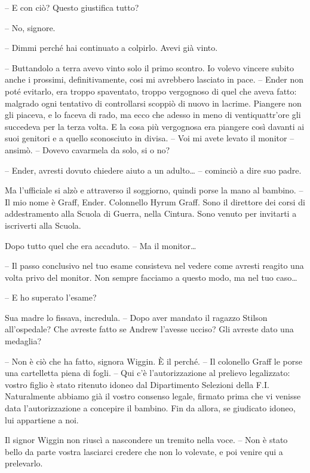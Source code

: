 {-- E con ciò? Questo giustifica tutto?}

{-- No, signore.}

{-- Dimmi perché hai continuato a colpirlo. Avevi già vinto.}

{-- Buttandolo a terra avevo vinto solo il primo scontro. Io volevo
	vincere subito anche i prossimi, definitivamente, cosi mi avrebbero
	lasciato in pace. -- Ender non poté evitarlo, era troppo spaventato,
	troppo vergognoso di quel che aveva fatto: malgrado ogni tentativo di
	controllarsi scoppiò di nuovo in lacrime. Piangere non gli piaceva, e lo
	faceva di rado, ma ecco che adesso in meno di ventiquattr'ore gli
	succedeva per la terza volta. E la cosa più vergognosa era piangere così
	davanti ai suoi genitori e a quello sconosciuto in divisa. -- Voi mi
	avete levato il monitor -- ansimò. -- Dovevo cavarmela da solo, si o
	no?}

{-- Ender, avresti dovuto chiedere aiuto a un adulto\ldots{} -- cominciò
	a dire suo padre.}

{Ma l'ufficiale si alzò e attraverso il soggiorno, quindi porse la mano
	al bambino. -- Il mio nome è Graff, Ender. Colonnello Hyrum Graff. Sono
	il direttore dei corsi di addestramento alla Scuola di Guerra, nella
	Cintura. Sono venuto per invitarti a iscriverti alla Scuola.}

{Dopo tutto quel che era accaduto. -- Ma il monitor\ldots{}}

{-- Il passo conclusivo nel tuo esame consisteva nel vedere come avresti
	reagito una volta privo del monitor. Non sempre facciamo a questo modo,
	ma nel tuo caso\ldots{}}

{-- E ho superato l'esame?}

{Sua madre lo fissava, incredula. -- Dopo aver mandato il ragazzo
	Stilson all'ospedale? Che avreste fatto se Andrew l'avesse ucciso? Gli
	avreste dato una medaglia?}

{-- Non è ciò che ha fatto, signora Wiggin. È il perché. -- Il colonello
	Graff le porse una cartelletta piena di fogli. -- Qui c'è
	l'autorizzazione al prelievo legalizzato: vostro figlio è stato ritenuto
	idoneo dal Dipartimento Selezioni della F.I. Naturalmente abbiamo già il
	vostro consenso legale, firmato prima che vi venisse data
	l'autorizzazione a concepire il bambino. Fin da allora, se giudicato
	idoneo, lui appartiene a noi.}

{Il signor Wiggin non riuscì a nascondere un tremito nella voce. -- Non
	è stato bello da parte vostra lasciarci credere che non lo volevate, e
	poi venire qui a prelevarlo.}

